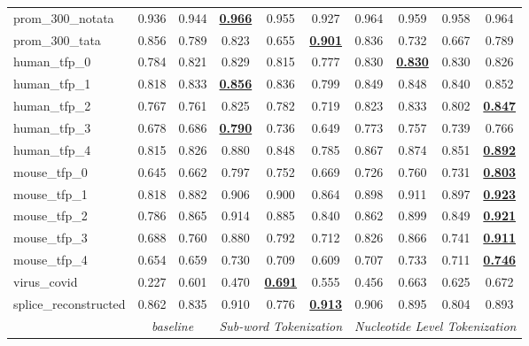 \begin{table*}[h!]
\begin{center}
\begin{tabular}{l|cc|ccc|cccc}
prom\_300\_notata & 0.936 & 0.944 & {\ul \textbf{0.966}} & 0.955 & 0.927 & 0.964 & 0.959 & 0.958 & 0.964 \\
prom\_300\_tata & 0.856 & 0.789 & 0.823 & 0.655 & {\ul \textbf{0.901}} & 0.836 & 0.732 & 0.667 & 0.789 \\
human\_tfp\_0 & 0.784 & 0.821 & 0.829 & 0.815 & 0.777 & 0.830 & {\ul \textbf{0.830}} & 0.830 & 0.826 \\
human\_tfp\_1 & 0.818 & 0.833 & {\ul \textbf{0.856}} & 0.836 & 0.799 & 0.849 & 0.848 & 0.840 & 0.852 \\
human\_tfp\_2 & 0.767 & 0.761 & 0.825 & 0.782 & 0.719 & 0.823 & 0.833 & 0.802 & {\ul \textbf{0.847}} \\
human\_tfp\_3 & 0.678 & 0.686 & {\ul \textbf{0.790}} & 0.736 & 0.649 & 0.773 & 0.757 & 0.739 & 0.766 \\
human\_tfp\_4 & 0.815 & 0.826 & 0.880 & 0.848 & 0.785 & 0.867 & 0.874 & 0.851 & {\ul \textbf{0.892}} \\
mouse\_tfp\_0 & 0.645 & 0.662 & 0.797 & 0.752 & 0.669 & 0.726 & 0.760 & 0.731 & {\ul \textbf{0.803}} \\
mouse\_tfp\_1 & 0.818 & 0.882 & 0.906 & 0.900 & 0.864 & 0.898 & 0.911 & 0.897 & {\ul \textbf{0.923}} \\
mouse\_tfp\_2 & 0.786 & 0.865 & 0.914 & 0.885 & 0.840 & 0.862 & 0.899 & 0.849 & {\ul \textbf{0.921}} \\
mouse\_tfp\_3 & 0.688 & 0.760 & 0.880 & 0.792 & 0.712 & 0.826 & 0.866 & 0.741 & {\ul \textbf{0.911}} \\
mouse\_tfp\_4 & 0.654 & 0.659 & 0.730 & 0.709 & 0.609 & 0.707 & 0.733 & 0.711 & {\ul \textbf{0.746}} \\
virus\_covid & 0.227 & 0.601 & 0.470 & {\ul \textbf{0.691}} & 0.555 & 0.456 & 0.663 & 0.625 & 0.672 \\
splice\_reconstructed & 0.862 & 0.835 & 0.910 & 0.776 & {\ul \textbf{0.913}} & 0.906 & 0.895 & 0.804 & 0.893 \\
\hline
\multicolumn{1}{l|}{} & \multicolumn{2}{c|}{\textit{baseline}} & \multicolumn{3}{c|}{\textit{Sub-word Tokenization}} & \multicolumn{4}{c}{\textit{Nucleotide Level Tokenization}} \\ \hline
\end{tabular}
\end{center}
\end{table*}